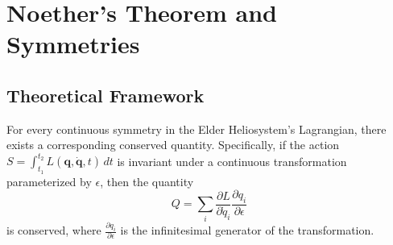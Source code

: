 \section{Noether's Theorem and Symmetries}

\subsection{Theoretical Framework}

\begin{theorem}
For every continuous symmetry in the Elder Heliosystem's Lagrangian, there exists a corresponding conserved quantity. Specifically, if the action $S = \int_{t_1}^{t_2} L(\mathbf{q}, \dot{\mathbf{q}}, t) \, dt$ is invariant under a continuous transformation parameterized by $\epsilon$, then the quantity
\begin{equation}
Q = \sum_i \frac{\partial L}{\partial \dot{q}_i} \frac{\partial q_i}{\partial \epsilon}
\end{equation}
is conserved, where $\frac{\partial q_i}{\partial \epsilon}$ is the infinitesimal generator of the transformation.
\end{theorem}

